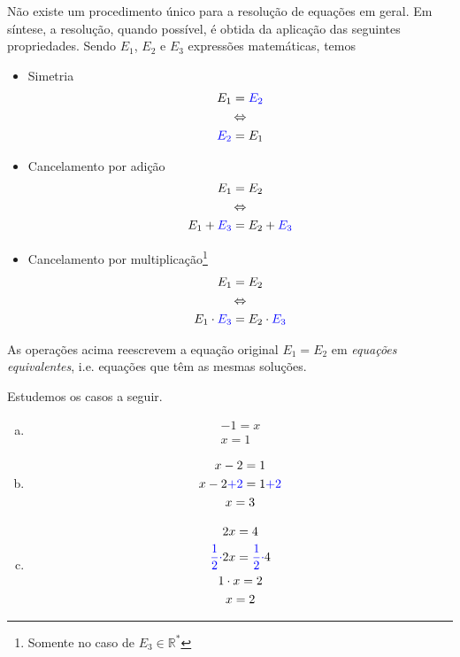 Não existe um procedimento único para a resolução de equações em geral. Em síntese, a resolução, quando possível, é obtida da aplicação das seguintes propriedades. Sendo $E_1$, $E_2$ e $E_3$ expressões matemáticas, temos
\begin{itemize}
\item Simetria
  \begin{equation}
    \begin{gathered}
      E_1 = {\color{blue}E_2} \\
      \Leftrightarrow \\
      {\color{blue}E_2} = E_1
    \end{gathered}
\end{equation}
\item Cancelamento por adição
  \begin{equation}
    \begin{gathered}
      E_1 = E_2 \\
      \Leftrightarrow \\
      E_1 + {\color{blue}E_3} = E_2 + {\color{blue}E_3}
  \end{gathered}
\end{equation}
\item Cancelamento por multiplicação\footnote{Somente no caso de $E_3\in\mathbb{R}^*$}
  \begin{equation}
    \begin{gathered}
      E_1 = E_2 \\
      \Leftrightarrow \\
      E_1\cdot {\color{blue}E_3} = E_2 \cdot {\color{blue}E_3}
  \end{gathered}
  \end{equation}
\end{itemize}

As operações acima reescrevem a equação original $E_1 = E_2$ em \emph{equações equivalentes}, i.e. equações que têm as mesmas soluções.

\begin{ex}
  Estudemos os casos a seguir.
  \begin{enumerate}[a)]
  \item
    \begin{gather}
      -1 = x\\
      x = 1
    \end{gather}
  \item
    \begin{gather}
      x - 2 = 1\\
      x - 2 {\color{blue}+ 2} = 1 {\color{blue}+ 2}\\
      x = 3
    \end{gather}
  \item
    \begin{gather}
      2x = 4\\
      {\color{blue}\frac{1}{2}\cdot}2x = {\color{blue}\frac{1}{2}\cdot}4\\
      1\cdot x = 2\\
      x = 2
    \end{gather}
  \end{enumerate}
\end{ex}

